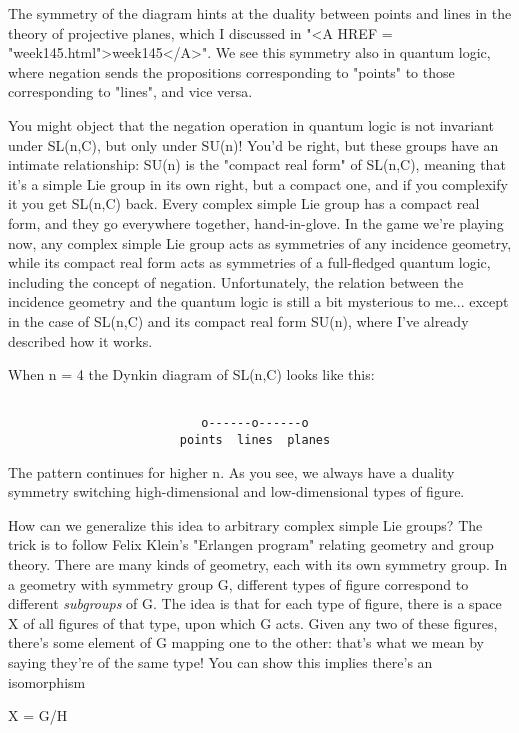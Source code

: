 The symmetry of the diagram hints at the duality between points and
lines in the theory of projective planes, which I discussed in "<A
HREF = "week145.html">week145</A>".  We see this symmetry also in
quantum logic, where negation sends the propositions corresponding to
"points" to those corresponding to "lines", and vice
versa.

You might object that the negation operation in quantum logic is not
invariant under SL(n,C), but only under SU(n)!  You'd be right, but
these groups have an intimate relationship: SU(n) is the "compact real
form" of SL(n,C), meaning that it's a simple Lie group in its own right,
but a compact one, and if you complexify it you get SL(n,C) back. 
Every complex simple Lie group has a compact real form, and they go
everywhere together, hand-in-glove.  In the game we're playing now, any
complex simple Lie group acts as symmetries of any incidence geometry,
while its compact real form acts as symmetries of a full-fledged quantum
logic, including the concept of negation.   Unfortunately, the relation
between the incidence geometry and the quantum logic is still a bit
mysterious to me... except in the case of SL(n,C) and its compact real 
form SU(n), where I've already described how it works.

When n = 4 the Dynkin diagram of SL(n,C) looks like this:


\begin{verbatim}

                           o------o------o
                        points  lines  planes       
\end{verbatim}
    
The pattern continues for higher n.  As you see, we always have a
duality symmetry switching high-dimensional and low-dimensional types
of figure.

How can we generalize this idea to arbitrary complex simple Lie groups?
The trick is to follow Felix Klein's "Erlangen program"
relating geometry and group theory.  There are many kinds of geometry,
each with its own symmetry group.  In a geometry with symmetry group G,
different types of figure correspond to different \emph{subgroups} of
G.  The idea is that for each type of figure, there is a space X of all
figures of that type, upon which G acts.  Given any two of these
figures, there's some element of G mapping one to the other: that's what
we mean by saying they're of the same type!  You can show this implies
there's an isomorphism

X = G/H

